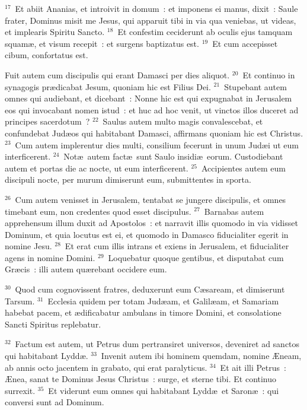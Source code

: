${}^{17}$~Et abiit Ananias, et introivit in domum~: et imponens ei manus, dixit~: Saule frater, Dominus misit me Jesus, qui apparuit tibi in via qua veniebas, ut videas, et implearis Spiritu Sancto.
${}^{18}$~Et confestim ceciderunt ab oculis ejus tamquam squam\ae , et visum recepit~: et surgens baptizatus est.
${}^{19}$~Et cum accepisset cibum, confortatus est.

 Fuit autem cum discipulis qui erant Damasci per dies aliquot.
${}^{20}$~Et continuo in synagogis pr\ae dicabat Jesum, quoniam hic est Filius Dei.
${}^{21}$~Stupebant autem omnes qui audiebant, et dicebant~: Nonne hic est qui expugnabat in Jerusalem eos qui invocabant nomen istud~: et huc ad hoc venit, ut vinctos illos duceret ad principes sacerdotum~?
${}^{22}$~Saulus autem multo magis convalescebat, et confundebat Jud\ae os qui habitabant Damasci, affirmans quoniam hic est Christus.
${}^{23}$~Cum autem implerentur dies multi, consilium fecerunt in unum Jud\ae i ut eum interficerent.
${}^{24}$~Not\ae\ autem fact\ae\ sunt Saulo insidi\ae\ eorum. Custodiebant autem et portas die ac nocte, ut eum interficerent.
${}^{25}$~Accipientes autem eum discipuli nocte, per murum dimiserunt eum, submittentes in sporta.


${}^{26}$~Cum autem venisset in Jerusalem, tentabat se jungere discipulis, et omnes timebant eum, non credentes quod esset discipulus.
${}^{27}$~Barnabas autem apprehensum illum duxit ad Apostolos~: et narravit illis quomodo in via vidisset Dominum, et quia locutus est ei, et quomodo in Damasco fiducialiter egerit in nomine Jesu.
${}^{28}$~Et erat cum illis intrans et exiens in Jerusalem, et fiducialiter agens in nomine Domini.
${}^{29}$~Loquebatur quoque gentibus, et disputabat cum Gr\ae cis~: illi autem qu\ae rebant occidere eum.


${}^{30}$~Quod cum cognovissent fratres, deduxerunt eum C\ae saream, et dimiserunt Tarsum.
${}^{31}$~Ecclesia quidem per totam Jud\ae am, et Galil\ae am, et Samariam habebat pacem, et \ae dificabatur ambulans in timore Domini, et consolatione Sancti Spiritus replebatur.


${}^{32}$~Factum est autem, ut Petrus dum pertransiret universos, deveniret ad sanctos qui habitabant Lydd\ae .
${}^{33}$~Invenit autem ibi hominem quemdam, nomine \AE neam, ab annis octo jacentem in grabato, qui erat paralyticus.
${}^{34}$~Et ait illi Petrus~: \AE nea, sanat te Dominus Jesus Christus~: surge, et sterne tibi. Et continuo surrexit.
${}^{35}$~Et viderunt eum omnes qui habitabant Lydd\ae\ et Saron\ae~: qui conversi sunt ad Dominum.


